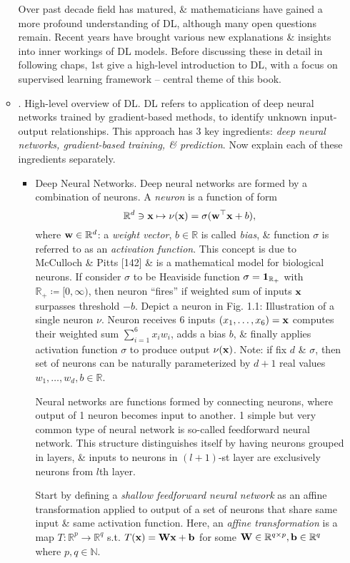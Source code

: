 \documentclass{article}
\begin{document}
\begin{itemize}
\begin{itemize}
		Over past decade field has matured, \& mathematicians have gained a more profound understanding of DL, although many open questions remain. Recent years have brought various new explanations \& insights into inner workings of DL models. Before discussing these in detail in following chaps, 1st give a high-level introduction to DL, with a focus on supervised learning framework -- central theme of this book.
		\item {. High-level overview of DL.} DL refers to application of deep neural networks trained by gradient-based methods, to identify unknown input-output relationships. This approach has 3 key ingredients: {\it deep neural networks, gradient-based training, \& prediction}. Now explain each of these ingredients separately.
		\begin{itemize}
			\item {\sf Deep Neural Networks.} Deep neural networks are formed by a combination of neurons. A {\it neuron} is a function of form
			\begin{equation}
				\label{neuron}
				\mathbb{R}^d\ni{\bf x}\mapsto\nu({\bf x}) = \sigma({\bf w}^\top{\bf x} + b),
			\end{equation}
			where ${\bf w}\in\mathbb{R}^d$: a {\it weight vector}, $b\in\mathbb{R}$ is called {\it bias}, \& function $\sigma$ is referred to as an {\it activation function}. This concept is due to McCulloch \& Pitts [142] \& is a mathematical model for biological neurons. If consider $\sigma$ to be Heaviside function $\sigma = {\bf1}_{\mathbb{R}_+}$ with $\mathbb{R}_+\coloneqq[0,\infty)$, then neuron ``fires'' if weighted sum of inputs ${\bf x}$ surpasses threshold $-b$. Depict a neuron in {\sf Fig. 1.1: Illustration of a single neuron $\nu$. Neuron receives 6 inputs $(x_1,\ldots,x_6) = {\bf x}$ computes their weighted sum $\sum_{i=1}^6 x_iw_i$, adds a bias $b$, \& finally applies activation function $\sigma$ to produce output $\nu({\bf x})$}. Note: if fix $d$ \& $\sigma$, then set of neurons can be naturally parameterized by $d + 1$ real values $w_1,\ldots,w_d,b\in\mathbb{R}$.
			
			Neural networks are functions formed by connecting neurons, where output of 1 neuron becomes input to another. 1 simple but very common type of neural network is so-called feedforward neural network. This structure distinguishes itself by having neurons grouped in layers, \& inputs to neurons in $(l + 1)$-st layer are exclusively neurons from $l$th layer.
			
			Start by defining a {\it shallow feedforward neural network} as an affine transformation applied to output of a set of neurons that share same input \& same activation function. Here, an {\it affine transformation} is a map $T:\mathbb{R}^p\to\mathbb{R}^q$ s.t. $T({\bf x}) = {\bf W}{\bf x} + {\bf b}$ for some ${\bf W}\in\mathbb{R}^{q\times p},{\bf b}\in\mathbb{R}^q$ where $p,q\in\mathbb{N}$.
			

\end{itemize}
\end{itemize}
\end{itemize}
\end{document}

